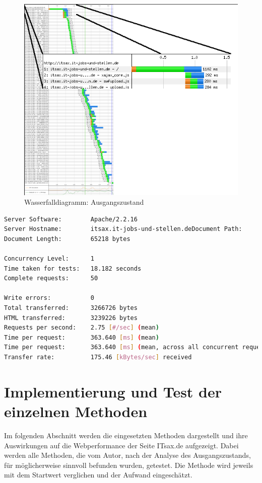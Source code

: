 \begin{figure}[!ht]
  \centering
  \includegraphics[scale=0.5]{material/start_waterfall_edited.png}
  \caption{Wasserfalldiagramm: Ausgangszustand}
  \label{fig:startwaterfall}
\end{figure}





\begin{lstlisting}[language=bash,label=Ausgabe von ab,caption=Ausgabe von ab]
Server Software:        Apache/2.2.16
Server Hostname:        itsax.it-jobs-und-stellen.deDocument Path:          /
Document Length:        65218 bytes

Concurrency Level:      1
Time taken for tests:   18.182 seconds
Complete requests:      50

Write errors:           0
Total transferred:      3266726 bytes
HTML transferred:       3239226 bytes
Requests per second:    2.75 [#/sec] (mean)
Time per request:       363.640 [ms] (mean)
Time per request:       363.640 [ms] (mean, across all concurrent requests)
Transfer rate:          175.46 [kBytes/sec] received
\end{lstlisting}

\section{Implementierung und Test der einzelnen Methoden}
Im folgenden Abschnitt werden die eingesetzten Methoden dargestellt und ihre Auswirkungen auf die Webperformance der Seite ITsax.de aufgezeigt. 
Dabei werden alle Methoden, die vom Autor, nach der Analyse des Ausgangszustands, für möglicherweise sinnvoll befunden wurden, getestet. Die Methode wird jeweils mit dem Startwert verglichen und der Aufwand eingeschätzt.
